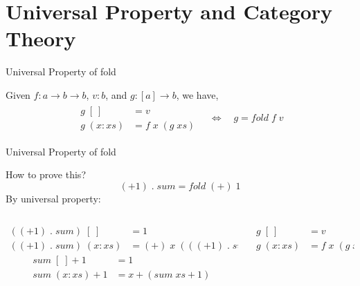 \documentclass[lualatex]{beamer}
\renewcommand{\_}{\textscale{.6}{\textunderscore}}
\begin{document}

\section{Universal Property and Category Theory}

\begin{frame}[fragile]{Universal Property of fold}

\begin{theorem}
Given $f: a \rightarrow b \rightarrow b$, $v: b$, and $g: [a] \rightarrow b$, we have,
\begin{align*}
\begin{split}
g\;[\:] & = v \\
g\;(x:xs) & = f\;x\;(g\;xs)
\end{split}\quad
\Longleftrightarrow\quad
g = fold\;f\;v
\end{align*}
\end{theorem}

\end{frame}

\begin{frame}[fragile]{Universal Property of fold}

How to prove this?
\[
(+1)\;.\;sum = fold\;(+)\;1
\]
\pause
By universal property:
\begin{columns}
\begin{column}{0.5\textwidth}
\begin{align*}
((+1)\;.\;sum)\;[\;] & = 1 \\
((+1)\;.\;sum)\;(x : xs) & = (+)\;x\;(((+1)\;.\;sum)\;xs)
\end{align*}
\begin{align*}
sum\;[\;] + 1 & = 1 \\
sum\;(x : xs) + 1 & = x + (sum\;xs + 1)
\end{align*}
\end{column}
\begin{column}{0.5\textwidth}
\begin{align*}
g\;[\:] & = v \\
g\;(x:xs) & = f\;x\;(g\;xs)
\end{align*}
\end{column}
\end{columns}

\end{frame}
\end{document}

